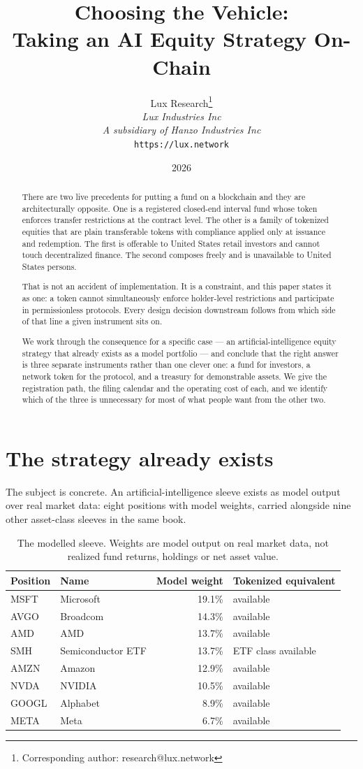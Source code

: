 \documentclass[11pt,a4paper]{article}
\title{Choosing the Vehicle:\\Taking an AI Equity Strategy On-Chain}
\author{
Lux Research\thanks{Corresponding author: research@lux.network} \\
\textit{Lux Industries Inc} \\
\textit{A subsidiary of Hanzo Industries Inc} \\
\texttt{https://lux.network}
}
\date{2026}
\begin{document}
\luxcoverpage

\begin{abstract}
There are two live precedents for putting a fund on a blockchain and they are
architecturally opposite. One is a registered closed-end interval fund whose
token enforces transfer restrictions at the contract level. The other is a family
of tokenized equities that are plain transferable tokens with compliance applied
only at issuance and redemption. The first is offerable to United States retail
investors and cannot touch decentralized finance. The second composes freely and
is unavailable to United States persons.

That is not an accident of implementation. It is a constraint, and this paper
states it as one: a token cannot simultaneously enforce holder-level restrictions
and participate in permissionless protocols. Every design decision downstream
follows from which side of that line a given instrument sits on.

We work through the consequence for a specific case --- an artificial-intelligence
equity strategy that already exists as a model portfolio --- and conclude that the
right answer is three separate instruments rather than one clever one: a fund for
investors, a network token for the protocol, and a treasury for demonstrable
assets. We give the registration path, the filing calendar and the operating cost
of each, and we identify which of the three is unnecessary for most of what people
want from the other two.
\end{abstract}

\newpage
\tableofcontents
\newpage

\section{The strategy already exists}

The subject is concrete. An artificial-intelligence sleeve exists as model output
over real market data: eight positions with model weights, carried alongside nine
other asset-class sleeves in the same book.

\begin{table}[h]
\centering
\begin{tabular}{llrl}
\toprule
Position & Name & Model weight & Tokenized equivalent \\
\midrule
MSFT & Microsoft & 19.1\% & available \\
AVGO & Broadcom & 14.3\% & available \\
AMD & AMD & 13.7\% & available \\
SMH & Semiconductor ETF & 13.7\% & ETF class available \\
AMZN & Amazon & 12.9\% & available \\
NVDA & NVIDIA & 10.5\% & available \\
GOOGL & Alphabet & 8.9\% & available \\
META & Meta & 6.7\% & available \\
\bottomrule
\end{tabular}
\caption{The modelled sleeve. Weights are model output on real market data, not
realized fund returns, holdings or net asset value.}
\end{table}
\end{document}
